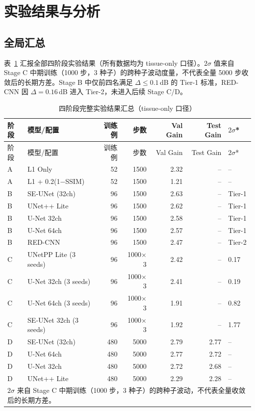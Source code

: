 \documentclass[UTF8,a4paper,12pt]{ctexart}
\begin{document}
\section{实验结果与分析}

\subsection{全局汇总}
表~\ref{tab:summary} 汇报全部四阶段实验结果（所有数据均为 tissue-only 口径）。$2\sigma$ 值来自 Stage C 中期训练（1000 步，3 种子）的跨种子波动度量，不代表全量 5000 步收敛后的长期方差。Stage B 中仅前四名满足 $\Delta \le 0.1$\,dB 的 Tier-1 标准，RED-CNN 因 $\Delta=0.16$\,dB 进入 Tier-2，未进入后续 Stage C/D。

\begin{longtable}{l l r r r r l}
    \caption{四阶段完整实验结果汇总（tissue-only 口径）\label{tab:summary}}\\
    \toprule
    阶段 & 模型/配置 & 训练例 & 步数 & Val Gain & Test Gain & $2\sigma$* \\
    \midrule
    \endfirsthead
    \toprule
    阶段 & 模型/配置 & 训练例 & 步数 & Val Gain & Test Gain & $2\sigma$* \\
    \midrule
    \endhead
    \bottomrule
    \endfoot
    A & L1 Only & 52 & 1500 & 2.32 & -- & -- \\
    A & L1 + 0.2(1$-$SSIM) & 52 & 1500 & 1.21 & -- & -- \\
    \midrule
    B & SE-UNet (32ch) & 96 & 1500 & 2.63 & -- & Tier-1 \\
    B & UNet++ Lite & 96 & 1500 & 2.62 & -- & Tier-1 \\
    B & U-Net 32ch & 96 & 1500 & 2.58 & -- & Tier-1 \\
    B & U-Net 64ch & 96 & 1500 & 2.57 & -- & Tier-1 \\
    B & RED-CNN & 96 & 1500 & 2.47 & -- & Tier-2 \\
    \midrule
    C & UNetPP Lite (3 seeds) & 96 & 1000$\times$3 & 2.42 & -- & 0.17 \\
    C & U-Net 32ch (3 seeds) & 96 & 1000$\times$3 & 2.41 & -- & 0.19 \\
    C & U-Net 64ch (3 seeds) & 96 & 1000$\times$3 & 1.91 & -- & 0.82 \\
    C & SE-UNet 32ch (3 seeds) & 96 & 1000$\times$3 & 1.92 & -- & 1.77 \\
    \midrule
    D & SE-UNet (32ch) & 480 & 5000 & 2.79 & 2.77 & -- \\
    D & U-Net 64ch & 480 & 5000 & 2.77 & 2.72 & -- \\
    D & U-Net 32ch & 480 & 5000 & 2.72 & 2.68 & -- \\
    D & UNet++ Lite & 480 & 5000 & 2.29 & 2.28 & -- \\
    \bottomrule
    \multicolumn{7}{l}{\footnotesize * $2\sigma$ 来自 Stage C 中期训练（1000 步，3 种子）的跨种子波动，不代表全量收敛后的长期方差。}
  \end{longtable}
\end{document}
